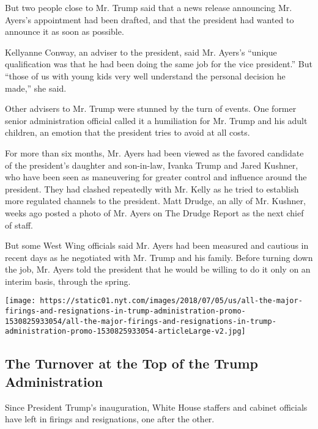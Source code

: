 But two people close to Mr. Trump said that a news release announcing
Mr. Ayers's appointment had been drafted, and that the president had
wanted to announce it as soon as possible.

Kellyanne Conway, an adviser to the president, said Mr. Ayers's ``unique
qualification was that he had been doing the same job for the vice
president.'' But ``those of us with young kids very well understand the
personal decision he made,'' she said.

Other advisers to Mr. Trump were stunned by the turn of events. One
former senior administration official called it a humiliation for Mr.
Trump and his adult children, an emotion that the president tries to
avoid at all costs.

For more than six months, Mr. Ayers had been viewed as the favored
candidate of the president's daughter and son-in-law, Ivanka Trump and
Jared Kushner, who have been seen as maneuvering for greater control and
influence around the president. They had clashed repeatedly with Mr.
Kelly as he tried to establish more regulated channels to the president.
Matt Drudge, an ally of Mr. Kushner, weeks ago posted a photo of Mr.
Ayers on The Drudge Report as the next chief of staff.

But some West Wing officials said Mr. Ayers had been measured and
cautious in recent days as he negotiated with Mr. Trump and his family.
Before turning down the job, Mr. Ayers told the president that he would
be willing to do it only on an interim basis, through the spring.

\href{https://www.nytimes.com/interactive/2018/03/16/us/politics/all-the-major-firings-and-resignations-in-trump-administration.html}{}

\texttt{[image: https://static01.nyt.com/images/2018/07/05/us/all-the-major-firings-and-resignations-in-trump-administration-promo-1530825933054/all-the-major-firings-and-resignations-in-trump-administration-promo-1530825933054-articleLarge-v2.jpg]}

\hypertarget{the-turnover-at-the-top-of-the-trump-administration}{%
\subsection{The Turnover at the Top of the Trump
Administration}\label{the-turnover-at-the-top-of-the-trump-administration}}

Since President Trump's inauguration, White House staffers and cabinet
officials have left in firings and resignations, one after the other.

